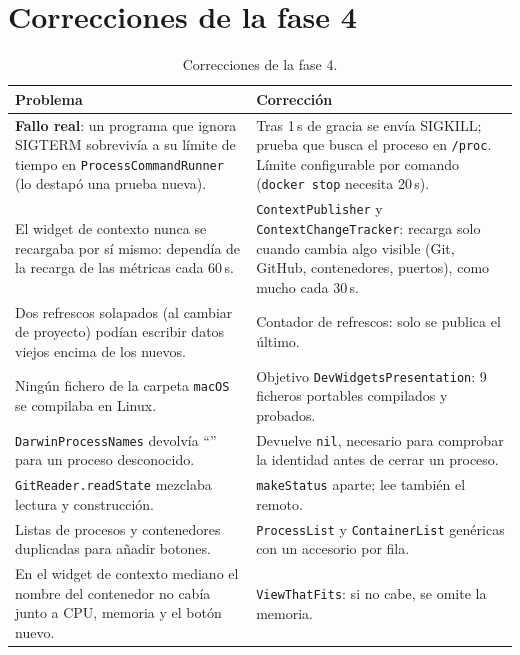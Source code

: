 \documentclass[11pt,a4paper]{article}
\begin{document}
\section{Correcciones de la fase 4}\label{sec:correcciones4}
\begin{table}[H]
\centering
\begin{tabularx}{\textwidth}{@{}XX@{}}
\toprule
\textbf{Problema} & \textbf{Corrección}\\
\midrule
\textbf{Fallo real}: un programa que ignora SIGTERM sobrevivía a su
límite de tiempo en \texttt{ProcessCommandRunner} (lo destapó una
prueba nueva). & Tras 1\,s de gracia se envía SIGKILL; prueba que
busca el proceso en \texttt{/proc}. Límite configurable por comando
(\texttt{docker stop} necesita 20\,s).\\
El widget de contexto nunca se recargaba por sí mismo: dependía de la
recarga de las métricas cada 60\,s. & \texttt{ContextPublisher} y
\texttt{ContextChangeTracker}: recarga solo cuando cambia algo
visible (Git, GitHub, contenedores, puertos), como mucho cada 30\,s.\\
Dos refrescos solapados (al cambiar de proyecto) podían escribir
datos viejos encima de los nuevos. & Contador de refrescos: solo se
publica el último.\\
Ningún fichero de la carpeta \texttt{macOS} se compilaba en Linux. &
Objetivo \texttt{DevWidgetsPresentation}: 9 ficheros portables
compilados y probados.\\
\texttt{DarwinProcessNames} devolvía ``'' para un proceso
desconocido. & Devuelve \texttt{nil}, necesario para comprobar la
identidad antes de cerrar un proceso.\\
\texttt{GitReader.readState} mezclaba lectura y construcción. &
\texttt{makeStatus} aparte; lee también el remoto.\\
Listas de procesos y contenedores duplicadas para añadir botones. &
\texttt{ProcessList} y \texttt{ContainerList} genéricas con un
accesorio por fila.\\
En el widget de contexto mediano el nombre del contenedor no cabía
junto a CPU, memoria y el botón nuevo. & \texttt{ViewThatFits}: si no
cabe, se omite la memoria.\\
\bottomrule
\end{tabularx}
\caption{Correcciones de la fase 4.}
\end{table}
\end{document}
